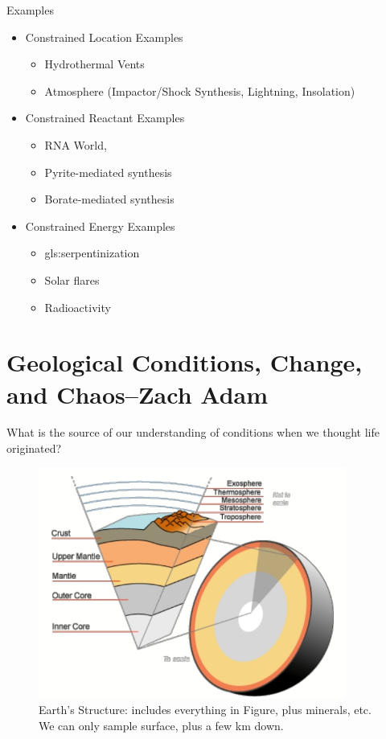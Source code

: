 \documentclass[]{article}
\begin{document}
Examples
\begin{itemize}
	\item Constrained Location Examples \begin{itemize}
		\item Hydrothermal Vents\cite{martin2006origin}
		\item Atmosphere (Impactor/Shock Synthesis, Lightning,
		Insolation)\cite{chyba1992endogenous} \cite{miller1959organic}
	\end{itemize}
	\item Constrained Reactant Examples 
	\begin{itemize}
		\item RNA World\cite{powner2009synthesis},
		\item Pyrite-mediated synthesis\cite{wachtershauser1993cradle}
		\item Borate-mediated synthesis\cite{grew2011borate}
	\end{itemize}
	\item Constrained Energy Examples
	\begin{itemize}
		\item \Gls{gls:serpentinization}\cite{schrenk2013serpentinization}
		\item Solar flares\cite{airapetian2016prebiotic}
		\item Radioactivity\cite{yi2018radiolytic} \cite{adam2018estimating}
	\end{itemize}
\end{itemize}

\section[Geological Conditions, Change, and Chaos]{Geological Conditions, Change, and Chaos--Zach Adam\cite{spencer2017growth}}

What is the source of our understanding of conditions when we thought life originated?
\begin{figure}[H]
	\caption[Earth's Structure]{Earth's Structure: includes everything in Figure, plus minerals, etc. We can only sample surface, plus a few km down.}\label{fig:EarthStructure} 
	\includegraphics[width=0.9\textwidth]{EarthStructure}
\end{figure}
\end{document}
